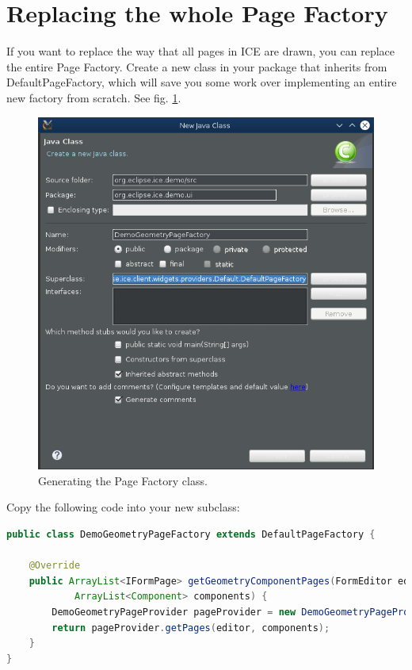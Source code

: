 \documentclass{article}
\begin{document}
\section{Replacing the whole Page Factory}

If you want to replace the way that all pages in ICE are drawn, you can replace
the entire Page Factory.  Create a new class in your package that inherits from
DefaultPageFactory, which will save you some work over implementing an entire
new factory from scratch. See fig. \ref{fig:icegeometryPageClass}.

\begin{figure}[h]
\includegraphics[width=\textwidth]{pics/dynamicUI_geometryPageClass.png}
\caption{Generating the Page Factory class.}
\label{fig:icegeometryPageClass}
\end{figure}

Copy the following code into your new subclass:

\begin{lstlisting}[language=java]
public class DemoGeometryPageFactory extends DefaultPageFactory {

    @Override
    public ArrayList<IFormPage> getGeometryComponentPages(FormEditor editor,
            ArrayList<Component> components) {
        DemoGeometryPageProvider pageProvider = new DemoGeometryPageProvider();
        return pageProvider.getPages(editor, components);
    }
}
\end{lstlisting}
\end{document}
